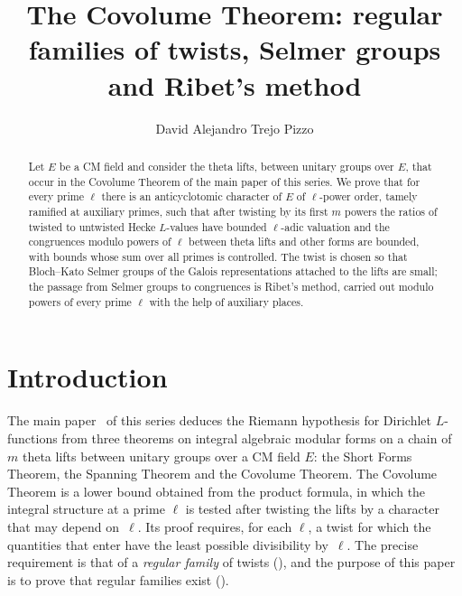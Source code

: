\documentclass[10pt]{amsart}
\theoremstyle{definition}
\theoremstyle{remark}
\begin{document}
\addtolength{\abovedisplayskip}{-3.4pt}
\addtolength{\belowdisplayskip}{-3.4pt}
\addtolength{\belowdisplayshortskip}{-2pt}
\title[The Covolume Theorem: regular families of twists]{The Covolume Theorem: regular families of twists, Selmer groups and Ribet's method}
\author{David Alejandro Trejo Pizzo}
\date{}
\begin{abstract}
Let $E$ be a CM field and consider the theta lifts, between unitary groups over $E$, that occur
in the Covolume Theorem of the main paper of this series. We prove that for every prime $\ell$
there is an anticyclotomic character of $E$ of $\ell$-power order, tamely ramified at auxiliary
primes, such that after twisting by its first $m$ powers the ratios of twisted to untwisted
Hecke $L$-values have bounded $\ell$-adic valuation and the congruences modulo powers of $\ell$
between theta lifts and other forms are bounded, with bounds whose sum over all primes is
controlled. The twist is chosen so that Bloch--Kato Selmer groups of the Galois representations
attached to the lifts are small; the passage from Selmer groups to congruences is Ribet's method,
carried out modulo powers of every prime $\ell$ with the help of auxiliary places.
\end{abstract}
\maketitle
\setcounter{tocdepth}{1}\tableofcontents

\section{Introduction}\label{C3:intro}

The main paper~\cite{P46} of this series deduces the Riemann hypothesis for Dirichlet
$L$-functions from three theorems on integral algebraic modular forms on a chain of $m$ theta
lifts between unitary groups over a CM field $E$: the Short Forms Theorem, the Spanning Theorem
and the Covolume Theorem. The Covolume Theorem is a lower bound obtained from the product
formula, in which the integral structure at a prime $\ell$ is tested after twisting the lifts by
a character that may depend on~$\ell$. Its proof requires, for each $\ell$, a twist for which the
quantities that enter have the least possible divisibility by~$\ell$. The precise requirement is
that of a \emph{regular family} of twists ({\cite[Definition~14.39]{P46}}), and the purpose of
this paper is to prove that regular families exist ({\cite[Proposition~14.40]{P46}}).
\end{document}
